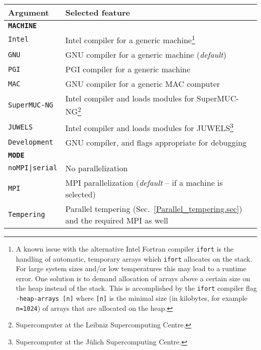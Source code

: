 \begin{table}[!ht]
	\begin{center}
		\begin{tabular}{@{} p{} p{} @{}}\toprule
			Argument & Selected feature \\\midrule
			\textbf{\texttt{MACHINE}} &  \\\midrule
			\texttt{Intel}  &   Intel compiler for a generic machine\footnote{A known issue with the alternative Intel Fortran compiler \texttt{ifort} is the handling of automatic, temporary arrays 
				which \texttt{ifort} allocates on the stack. For large system sizes and/or low temperatures this may lead to a runtime error. One solution is to demand allocation of arrays above a certain size on the heap instead of the stack. This is accomplished by the \texttt{ifort} compiler flag \texttt{-heap-arrays [n]} where \texttt{[n]} is the minimal size (in kilobytes, for example \texttt{n=1024}) of arrays that are allocated on the heap.} \\
			\texttt{GNU}  &   GNU compiler for a generic machine (\emph{default}) \\
			\texttt{PGI}  &   PGI compiler for a generic machine \\
			\texttt{MAC}  &   GNU compiler for a generic MAC computer \\
			\texttt{SuperMUC-NG}  &  Intel compiler and loads modules for SuperMUC-NG\footnote{Supercomputer at the Leibniz Supercomputing Centre.} \\
			\texttt{JUWELS}  &  Intel compiler and loads modules for JUWELS\footnote{Supercomputer at the J\"ulich Supercomputing Centre.} \\
			\texttt{Development}  &  GNU compiler, and flags appropriate for debugging  \vspace{7pt}\\
			
			\textbf{\texttt{MODE}} &  \\\midrule
			\texttt{noMPI|serial}  &  No parallelization \\
			\texttt{MPI}  &  MPI parallelization (\emph{default} -- if a machine is selected) \\
			\texttt{Tempering}  &  Parallel tempering (Sec.~\ref{Parallel_tempering.sec}) and the required MPI as well \vspace{7pt}\\ 
			

\end{tabular}
\end{center}
\end{table}
